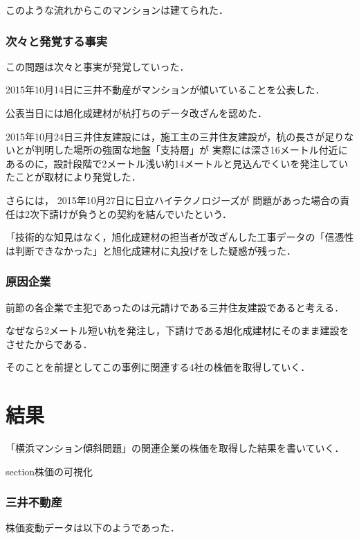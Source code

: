 {このような流れからこのマンションは建てられた．

\subsection{次々と発覚する事実}
この問題は次々と事実が発覚していった．

2015年10月14日に三井不動産がマンションが傾いていることを公表した．

公表当日には旭化成建材が杭打ちのデータ改ざんを認めた．


2015年10月24日三井住友建設には，施工主の三井住友建設が，杭の長さが足りないとが判明した場所の強固な地盤「支持層」が
実際には深さ16メートル付近にあるのに，設計段階で2メートル浅い約14メートルと見込んでくいを発注していたことが取材により発覚した．

さらには，
2015年10月27日に日立ハイテクノロジーズが
問題があった場合の責任は2次下請けが負うとの契約を結んでいたという．

「技術的な知見はなく，旭化成建材の担当者が改ざんした工事データの「信憑性は判断できなかった」と旭化成建材に丸投げをした疑惑が残った．


\subsection{原因企業}

前節の各企業で主犯であったのは元請けである三井住友建設であると考える．

なぜなら2メートル短い杭を発注し，下請けである旭化成建材にそのまま建設をさせたからである．

そのことを前提としてこの事例に関連する4社の株価を取得していく．

\chapter{結果}
「横浜マンション傾斜問題」の関連企業の株価を取得した結果を書いていく．


section{株価の可視化}
\subsection{三井不動産}

株価変動データは以下のようであった．


}
